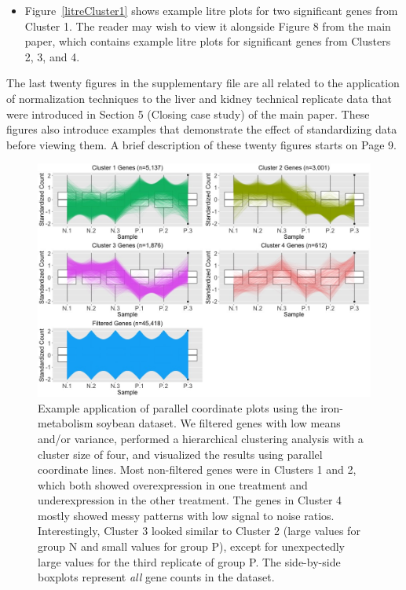 \documentclass{article}
\begin{document}
\begin{itemize}
  \item Figure~\ref{litreCluster1} shows example litre plots for two significant genes from Cluster 1. The reader may wish to view it alongside Figure 8 from the main paper, which contains example litre plots for significant genes from Clusters 2, 3, and 4.
  
  \end{itemize}
  
  The last twenty figures in the supplementary file are all related to the application of normalization techniques to the liver and kidney technical replicate data that were introduced in Section 5 (Closing case study) of the main paper. These figures also introduce examples that demonstrate the effect of standardizing data before viewing them. A brief description of these twenty figures starts on Page 9.
  
  
  \clearpage
  \null
  \begin{figure}[t!]
  \centerline{\includegraphics[width=\columnwidth]{../MakeFigures/sbIRClusters.jpg}}
  \caption{Example application of parallel coordinate plots using the iron-metabolism soybean dataset. We filtered genes with low means and/or variance, performed a hierarchical clustering analysis with a cluster size of four, and visualized the results using parallel coordinate lines. Most non-filtered genes were in Clusters 1 and 2, which both showed overexpression in one treatment and underexpression in the other treatment. The genes in Cluster 4 mostly showed messy patterns with low signal to noise ratios. Interestingly, Cluster 3 looked similar to Cluster 2 (large values for group N and small values for group P), except for unexpectedly large values for the third replicate of group P. The side-by-side boxplots represent \textit{all} gene counts in the dataset.
  \label{sbIRClusters}}
  \end{figure}
  
\end{document}
